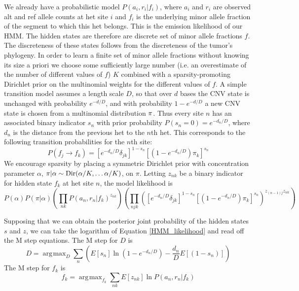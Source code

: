 \documentclass[nofootinbib,amssymb,amsmath]{revtex4}
\DeclareMathOperator*{\argmax}{\arg\!\max}
\begin{document}
We already have a probabilistic model $P(a_i, r_i | f_i)$, where $a_i$ and $r_i$ are observed alt and ref allele counts at het site $i$ and $f_i$ is the underlying minor allele fraction of the segment to which this het belongs.  This is the emission likelihood of our HMM.  The hidden states are therefore are discrete set of minor allele fractions $f$.  The discreteness of these states follows from the discreteness of the tumor's phylogeny.  In order to learn a finite set of minor allele fractions without knowing its size a priori we choose some sufficiently large number (i.e. an overestimate of the number of different values of $f$) $K$ combined with a sparsity-promoting Dirichlet prior on the multinomial weights for the different values of $f$.  A simple transition model assumes a length scale $D$, so that over $d$ bases the CNV state is unchanged with probability $e^{-d/D}$, and with probability $1 - e^{-d/D}$ a new CNV state is chosen from a multinomial distribution ${\bf \pi}$.  Thus every site $n$ has an associated binary indicator $s_n$ with prior probability $P(s_n = 0) = e^{-d_n/D}$, where $d_n$ is the distance from the previous het to the $n$th het.  This corresponds to the following transition probabilities for the $n$th site:
%
\begin{equation}
P(f_j \rightarrow f_k) = \left[ e^{-d_n/D} \delta_{jk}\right]^{1 - s_n} \left[ (1-e^{-d_n/D}) \pi_k \right]^{s_n}
\end{equation}
%
We encourage sparsity by placing a symmetric Dirichlet prior with concentration parameter $\alpha$, $\pi | \alpha \sim {\rm Dir}(\alpha/K, \ldots \alpha /K)$, on $\pi$.  Letting $z_{nk}$ be a binary indicator for hidden state $f_k$ at het site $n$, the model likelihood is
\begin{equation}
P(\alpha)  P(\pi | \alpha) \left(  \prod_{nk} P(a_n, r_n | f_k)^{z_{nk}} \right) \left( \prod_{njk} \left( \left[ e^{-d_n/D} \delta_{jk}\right]^{1 - s_n} \left[ (1-e^{-d_n/D}) \pi_k \right]^{s_n} \right)^{z_{(n-1)j} z_{nk}} \right)
\label{HMM_likelihood}
\end{equation}

Supposing that we can obtain the posterior joint probability of the hidden states $s$ and $z$, we can take the logarithm of Equation \ref{HMM_likelihood} and read off the M step equations.  The M step for $D$ is
\begin{equation}
D = \argmax_D    \sum_{n} \left( E \left[s_n  \right] \ln (1 - e^{-d_n/D}) - \frac{d_n}{D} E \left[(1-s_n)  \right] \right)
\label{M_D}
\end{equation}
The M step for $f_k$ is
\begin{equation}
f_k = \argmax_{f_k} \sum_{nk} E[z_{nk}] \ln P(a_n, r_n | f_k)
\label{M_f}
\end{equation}
\end{document}
